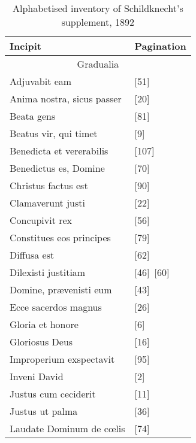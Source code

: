   \vspace*{\fill}

  \begin{landscape}

      \begin{table}[ht]
        \caption{Alphabetised inventory of Schildknecht's  supplement, 1892}
        \centering
        \footnotesize
        \label{tab:schildknecht-supplement}
        \begin{tabular}{@{}ll@{}}
        \toprule
        Incipit                    & Pagination \\ \midrule
        \multicolumn{2}{c}{Gradualia}          \\
        Adjuvabit eam              & [51]      \\
        Anima nostra, sicus passer & [20]      \\
        Beata gens                 & [81]      \\
        Beatus vir, qui timet      & [9]       \\
        Benedicta et vererabilis   & [107]     \\
        Benedictus es, Domine      & [70]      \\
        Christus factus est        & [90]      \\
        Clamaverunt justi          & [22]      \\
        Concupivit rex             & [56]      \\
        Constitues eos principes   & [79]      \\
        Diffusa est                & [62]      \\
        Dilexisti justitiam        & [46]~[60] \\
        Domine, prævenisti eum     & [43]      \\
        Ecce sacerdos magnus       & [26]      \\
        Gloria et honore           & [6]       \\
        Gloriosus Deus             & [16]      \\
        Improperium exspectavit    & [95]      \\
        Inveni David               & [2]       \\
        Justus cum ceciderit       & [11]      \\
        Justus ut palma            & [36]      \\
        Laudate Dominum de cœlis   & [74]      \\

\end{tabular}
\end{table}
\end{landscape}
